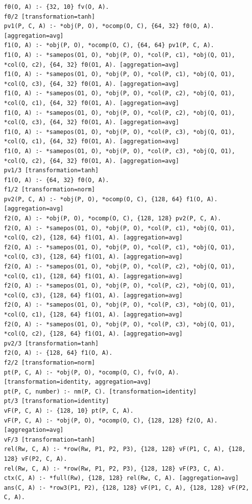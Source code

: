 \begin{Verbatim}[fontsize=\small,breaklines]
f0(O, A) :- {32, 10} fv(O, A).
f0/2 [transformation=tanh]
pv1(P, C, A) :- *obj(P, O), *ocomp(O, C), {64, 32} f0(O, A). [aggregation=avg]
f1(O, A) :- *obj(P, O), *ocomp(O, C), {64, 64} pv1(P, C, A).
f1(O, A) :- *samepos(O1, O), *obj(P, O), *col(P, c1), *obj(Q, O1), *col(Q, c2), {64, 32} f0(O1, A). [aggregation=avg]
f1(O, A) :- *samepos(O1, O), *obj(P, O), *col(P, c1), *obj(Q, O1), *col(Q, c3), {64, 32} f0(O1, A). [aggregation=avg]
f1(O, A) :- *samepos(O1, O), *obj(P, O), *col(P, c2), *obj(Q, O1), *col(Q, c1), {64, 32} f0(O1, A). [aggregation=avg]
f1(O, A) :- *samepos(O1, O), *obj(P, O), *col(P, c2), *obj(Q, O1), *col(Q, c3), {64, 32} f0(O1, A). [aggregation=avg]
f1(O, A) :- *samepos(O1, O), *obj(P, O), *col(P, c3), *obj(Q, O1), *col(Q, c1), {64, 32} f0(O1, A). [aggregation=avg]
f1(O, A) :- *samepos(O1, O), *obj(P, O), *col(P, c3), *obj(Q, O1), *col(Q, c2), {64, 32} f0(O1, A). [aggregation=avg]
pv1/3 [transformation=tanh]
f1(O, A) :- {64, 32} f0(O, A).
f1/2 [transformation=norm]
pv2(P, C, A) :- *obj(P, O), *ocomp(O, C), {128, 64} f1(O, A). [aggregation=avg]
f2(O, A) :- *obj(P, O), *ocomp(O, C), {128, 128} pv2(P, C, A).
f2(O, A) :- *samepos(O1, O), *obj(P, O), *col(P, c1), *obj(Q, O1), *col(Q, c2), {128, 64} f1(O1, A). [aggregation=avg]
f2(O, A) :- *samepos(O1, O), *obj(P, O), *col(P, c1), *obj(Q, O1), *col(Q, c3), {128, 64} f1(O1, A). [aggregation=avg]
f2(O, A) :- *samepos(O1, O), *obj(P, O), *col(P, c2), *obj(Q, O1), *col(Q, c1), {128, 64} f1(O1, A). [aggregation=avg]
f2(O, A) :- *samepos(O1, O), *obj(P, O), *col(P, c2), *obj(Q, O1), *col(Q, c3), {128, 64} f1(O1, A). [aggregation=avg]
f2(O, A) :- *samepos(O1, O), *obj(P, O), *col(P, c3), *obj(Q, O1), *col(Q, c1), {128, 64} f1(O1, A). [aggregation=avg]
f2(O, A) :- *samepos(O1, O), *obj(P, O), *col(P, c3), *obj(Q, O1), *col(Q, c2), {128, 64} f1(O1, A). [aggregation=avg]
pv2/3 [transformation=tanh]
f2(O, A) :- {128, 64} f1(O, A).
f2/2 [transformation=norm]
pt(P, C, A) :- *obj(P, O), *ocomp(O, C), fv(O, A). [transformation=identity, aggregation=avg]
pt(P, C, number) :- nm(P, C). [transformation=identity]
pt/3 [transformation=identity]
vF(P, C, A) :- {128, 10} pt(P, C, A).
vF(P, C, A) :- *obj(P, O), *ocomp(O, C), {128, 128} f2(O, A). [aggregation=avg]
vF/3 [transformation=tanh]
rel(Rw, C, A) :- *row(Rw, P1, P2, P3), {128, 128} vF(P1, C, A), {128, 128} vF(P2, C, A).
rel(Rw, C, A) :- *row(Rw, P1, P2, P3), {128, 128} vF(P3, C, A).
ctx(C, A) :- *full(Rw), {128, 128} rel(Rw, C, A). [aggregation=avg]
ans(C, A) :- *row3(P1, P2), {128, 128} vF(P1, C, A), {128, 128} vF(P2, C, A).

\end{Verbatim}
